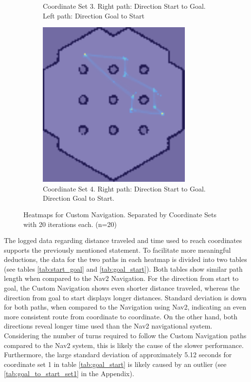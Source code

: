 \documentclass[%
paper=A4,               %
twoside=true,           %
openright,              %
11pt,                   %
bibliography=totoc,     %
titlepage=on,           %
DIV=12,                 %
BCOR=1.5cm,             %
parskip=half,            %
final
]{scrreprt}
\begin{document}
\begin{figure}[H]
\begin{subfigure}[b]{0.45\textwidth}
			\caption{Coordinate Set 3. Right path: Direction Start to Goal. Left path: Direction Goal to Start}
			\label{fig:fig19}
		\end{subfigure}
			\hfill
		\begin{subfigure}[b]{0.45\textwidth}
			\centering
			\includegraphics[width=0.85\textwidth]{Graphics/heatmapCustomSet4.png}
			\caption{Coordinate Set 4. Right path: Direction Start to Goal. Direction Goal to Start. }
			\label{fig:fig20}
		\end{subfigure}
		\caption{Heatmaps for Custom Navigation. Separated by Coordinate Sets with 20 iterations each. (n=20)}
		\label{fig:heatmapsCustom}
	\end{figure}
	The logged data regarding distance traveled and time used to reach coordinates supports the previously mentioned statement. To facilitate more meaningful deductions, the data for the two paths in each heatmap is divided into two tables (see tables \ref{tab:start_goal} and \ref{tab:goal_start}). Both tables show similar path length when compared to the Nav2 Navigation. For the direction from start to goal, the Custom Navigation shows even shorter distance traveled, whereas the direction from goal to start displays longer distances. Standard deviation is down for both paths, when compared to the Navigation using Nav2, indicating an even more consistent route from coordinate to coordinate. On the other hand, both directions reveal longer time used than the Nav2 navigational system. Considering the number of turns required to follow the Custom Navigation paths compared to the Nav2 system, this is likely the cause of the slower performance. Furthermore, the large standard deviation of approximately 5.12 seconds for coordinate set 1 in table \ref{tab:goal_start} is likely caused by an outlier (see \ref{tab:goal_to_start_set1} in the Appendix). 
\end{document}
